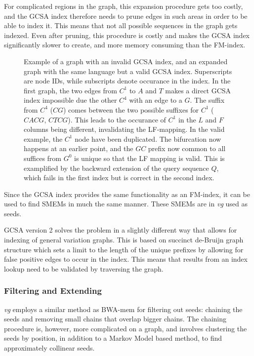 For complicated regions in the graph, this expansion procedure gets too costly, and the GCSA index therefore needs to prune edges in such areas in order to be able to index it.
This means that not all possible sequences in the graph gets indexed. 
Even after pruning, this procedure is costly and makes the GCSA index significantly slower to create, and more memory consuming than the FM-index.

\begin{figure}
  \tikzpicture
  
  \endtikzpicture
  \caption{
    Example of a graph with an invalid GCSA index, and an expanded graph with the same language but a valid GCSA index. Superscripts are node IDs, while subscripts denote occurance in the index. 
    In the first graph, the two edges from $C^1$ to $A$ and $T$ makes a direct GCSA index impossible due the other $C^4$ with an edge to a $G$. The suffix from $C^4$ ($CG$) comes between the two possible suffixes for $C^1$ ($CACG$, $CTCG$). This leads to the occurance of $C^1$ in the $L$ and $F$ columns being different, invalidating the LF-mapping.
    In the valid example, the $C^1$ node have been duplicated. The bifurcation now happens at an earlier point, and the $GC$ prefix now common to all suffices from $G^0$ is unique so that the LF mapping is valid. This is examplified by the backward extension of the query sequence $Q$, which fails in the first index but is correct in the second index.
}
    \label{fig:gcsa}
\end{figure}

Since the GCSA index provides the same functionality as an FM-index, it can be used to find SMEMs in much the same manner. These SMEMs are in \emph{vg} used as seeds. 

GCSA version 2 solves the problem in a slightly different way that allows for indexing of general variation graphs.
This is based on succinct de-Bruijn graph~\cite{succinctdebruijn} structure which sets a limit to the length of the unique prefixes by allowing for false positive edges to occur in the index.
This means that results from an index lookup need to be validated by traversing the graph. 

\subsubsection{Filtering and Extending}
\emph{vg} employs a similar method as BWA-mem for filtering out seeds: chaining the seeds and removing small chains that overlap bigger chains.
The chaining procedure is, however, more complicated on a graph, and involves clustering the seeds by position, in addition to a Markov Model based method, to find approximately collinear seeds.


